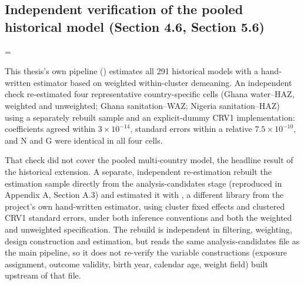 \par\endgroup

\subsection{Independent verification of the pooled historical model (Section 4.6, Section 5.6)}\label{sec:B.2}

\begingroup\edef\ThesisSavedIndent{\the\parindent}\raggedright\parindent=\ThesisSavedIndent\relax{}

This thesis's own pipeline () estimates all 291 historical models with a hand-written estimator based on weighted within-cluster demeaning. An independent check re-estimated four representative country-specific cells (Ghana water--HAZ, weighted and unweighted; Ghana sanitation--WAZ; Nigeria sanitation--HAZ) using a separately rebuilt sample and an explicit-dummy CRV1 implementation: coefficients agreed within \(3\times10^{-14}\), standard errors within a relative \(7.5\times10^{-10}\), and N and G were identical in all four cells.

\par\endgroup

That check did not cover the pooled multi-country model, the headline result of the historical extension. A separate, independent re-estimation rebuilt the estimation sample directly from the analysis-candidates stage (reproduced in Appendix A, Section A.3) and estimated it with , a different library from the project's own hand-written estimator, using cluster fixed effects and clustered CRV1 standard errors, under both inference conventions and both the weighted and unweighted specification. The rebuild is independent in filtering, weighting, design construction and estimation, but reads the same analysis-candidates file as the main pipeline, so it does not re-verify the variable constructions (exposure assignment, outcome validity, birth year, calendar age, weight field) built upstream of that file.


